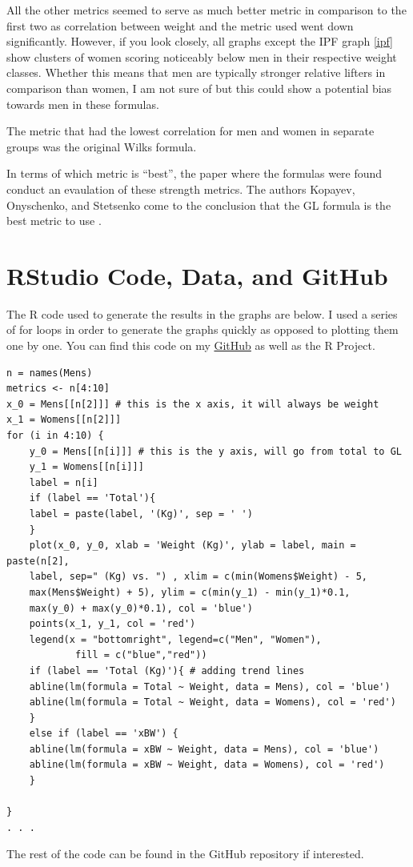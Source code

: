 \documentclass[10pt,letterpaper]{article}
\begin{document}
    All the other metrics seemed to serve as much better metric in comparison to the first two as correlation between weight and the metric used went down significantly. However, if you look closely, all graphs except the IPF graph \ref{ipf} show clusters of women scoring noticeably below men in their respective weight classes. Whether this means that men are typically stronger relative lifters in comparison than women, I am not sure of but this could show a potential bias towards men in these formulas. 
    
    The metric that had the lowest correlation for men and women in separate groups was the original Wilks formula. 


    In terms of which metric is ``best'', the paper where the formulas were found conduct an evaulation of these strength metrics. The authors Kopayev, Onyschenko, and Stetsenko come to the conclusion that the GL formula is the best metric to use \cite{formulas}. 


    \newpage
    \section{RStudio Code, Data, and GitHub}
    The R code used to generate the results in the graphs are below. I used a series of for loops in order to generate the graphs quickly as opposed to plotting them one by one. You can find this code on my \href{https://github.com/mirandaricky9/math353DataVisualization}{GitHub} as well as the R Project.

    \begin{verbatim}
n = names(Mens)
metrics <- n[4:10]
x_0 = Mens[[n[2]]] # this is the x axis, it will always be weight
x_1 = Womens[[n[2]]]
for (i in 4:10) {
    y_0 = Mens[[n[i]]] # this is the y axis, will go from total to GL
    y_1 = Womens[[n[i]]]
    label = n[i]
    if (label == 'Total'){
    label = paste(label, '(Kg)', sep = ' ')
    }
    plot(x_0, y_0, xlab = 'Weight (Kg)', ylab = label, main = paste(n[2],
    label, sep=" (Kg) vs. ") , xlim = c(min(Womens$Weight) - 5, 
    max(Mens$Weight) + 5), ylim = c(min(y_1) - min(y_1)*0.1, 
    max(y_0) + max(y_0)*0.1), col = 'blue')
    points(x_1, y_1, col = 'red')
    legend(x = "bottomright", legend=c("Men", "Women"), 
            fill = c("blue","red"))
    if (label == 'Total (Kg)'){ # adding trend lines
    abline(lm(formula = Total ~ Weight, data = Mens), col = 'blue')
    abline(lm(formula = Total ~ Weight, data = Womens), col = 'red')
    }
    else if (label == 'xBW') {
    abline(lm(formula = xBW ~ Weight, data = Mens), col = 'blue')
    abline(lm(formula = xBW ~ Weight, data = Womens), col = 'red')
    }

}
. . .
    \end{verbatim}
The rest of the code can be found in the GitHub repository if interested.
\end{document}
